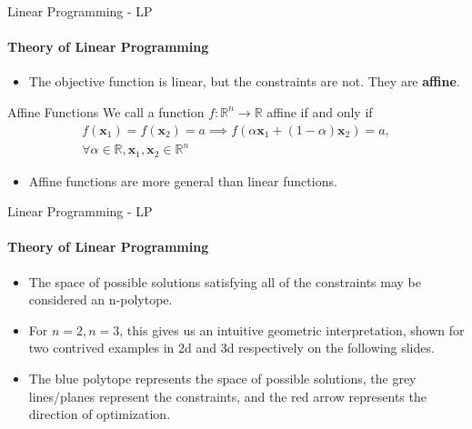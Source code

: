 \documentclass{beamer}
\renewcommand{\vec}{\mathbf}
\begin{document}
	\begin{frame}{Linear Programming - LP}
		\framesubtitle{Theory of Linear Programming}
		\begin{itemize}
			\item The objective function is linear, but the constraints are not. They are \textbf{affine}.
		\end{itemize}
		\begin{block}{Affine Functions}
			We call a function $f:\mathbb{R}^n\to\mathbb{R}$ affine if and only if \begin{align*}
				f(\vec{x}_1)=f(\vec{x}_2)=a\implies f(\alpha\vec{x}_1 + (1-\alpha)\vec{x}_2)=a,\\
				\forall\alpha\in\mathbb{R}, \vec{x}_1,\vec{x}_2\in\mathbb{R}^n
			\end{align*}
		\end{block}
	\begin{itemize}
		\item Affine functions are more general than linear functions.
	\end{itemize}
	\end{frame}

	\begin{frame}{Linear Programming - LP}
		\framesubtitle{Theory of Linear Programming}
			\begin{itemize}
				\item The space of possible solutions satisfying all of the constraints may be considered an n-polytope.
				\item For $n=2, n=3$, this gives us an intuitive geometric interpretation, shown for two contrived examples in 2d and 3d respectively on the following slides.
				\item The blue polytope represents the space of possible solutions, the grey lines/planes represent the constraints, and the red arrow represents the direction of optimization.
			\end{itemize}
	\end{frame}	
\end{document}
